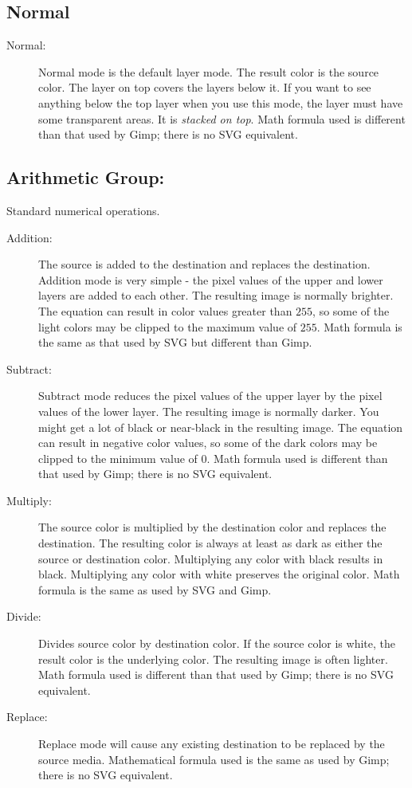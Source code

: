 \subsection*{Normal}%
\label{sub:normal2}

\begin{description}
    \item[Normal:] Normal mode is the default layer mode.  The result color is the source color.  The layer on top covers the layers below it.  If you want to see anything below the top layer when you use this mode, the layer must have some transparent areas.  It is \textit{stacked on top}.  Math formula used is different than that used by Gimp; there is no SVG equivalent.
\end{description}

\subsection*{Arithmetic Group:}%
\label{sub:arithmetic_group}

Standard numerical operations.

\begin{description}
    \item[Addition:] The source is added to the destination and replaces the destination.  Addition mode is very simple - the pixel values of the upper and lower layers are added to each other.  The resulting image is normally brighter.  The equation can result in color values greater than $255$, so some of the light colors may be clipped to the maximum value of $255$.  Math formula is the same as that used by SVG but different than Gimp.
    \item[Subtract:] Subtract mode reduces the pixel values of the upper layer by the pixel values of the lower layer.  The resulting image is normally darker.  You might get a lot of black or near-black in the resulting image.  The equation can result in negative color values, so some of the dark colors may be clipped to the minimum value of $0$.  Math formula used is different than that used by Gimp; there is no SVG equivalent.
    \item[Multiply:] The source color is multiplied by the destination color and replaces the destination.  The resulting color is always at least as dark as either the source or destination color.  Multiplying any color with black results in black.  Multiplying any color with white preserves the original color.  Math formula is the same as used by SVG and Gimp.
    \item[Divide:] Divides source color by destination color.  If the source color is white, the result color is the underlying color.  The resulting image is often lighter.  Math formula used is different than that used by Gimp; there is no SVG equivalent.
    \item[Replace:] Replace mode will cause any existing destination to be replaced by the source media.  Mathematical formula used is the same as used by Gimp; there is no SVG equivalent.
\end{description}

